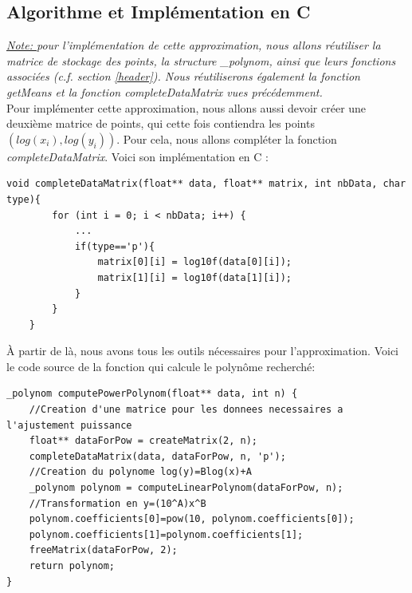 \subsection{Algorithme et Implémentation en C}
\textit{\underline{Note: } pour l'implémentation de cette approximation, nous allons réutiliser la matrice de stockage des points, la structure \_polynom, ainsi que leurs fonctions associées (c.f. section \ref{header}). Nous réutiliserons également la fonction getMeans et la fonction completeDataMatrix vues précédemment.}\vspace{5pt}\\
Pour implémenter cette approximation, nous allons aussi devoir créer une deuxième matrice de points, qui cette fois contiendra les points $(log(x_i), log(y_i))$. Pour cela, nous allons compléter la fonction \textit{completeDataMatrix}. Voici son implémentation en C :\\
\begin{lstlisting}[mathescape=true, basicstyle=\fontsize{8}{10}\selectfont, frame=single]
    void completeDataMatrix(float** data, float** matrix, int nbData, char type){
        for (int i = 0; i < nbData; i++) {
            ...
            if(type=='p'){
                matrix[0][i] = log10f(data[0][i]);
                matrix[1][i] = log10f(data[1][i]);
            }
        }
    }       
\end{lstlisting}
À partir de là, nous avons tous les outils nécessaires pour l'approximation. Voici le code source de la fonction qui calcule le polynôme recherché:\\
\begin{lstlisting}[mathescape=true, basicstyle=\fontsize{8}{10}\selectfont, frame=single]
_polynom computePowerPolynom(float** data, int n) {
    //Creation d'une matrice pour les donnees necessaires a l'ajustement puissance
    float** dataForPow = createMatrix(2, n);
    completeDataMatrix(data, dataForPow, n, 'p');
    //Creation du polynome log(y)=Blog(x)+A
    _polynom polynom = computeLinearPolynom(dataForPow, n);
    //Transformation en y=(10^A)x^B
    polynom.coefficients[0]=pow(10, polynom.coefficients[0]);
    polynom.coefficients[1]=polynom.coefficients[1];
    freeMatrix(dataForPow, 2);
    return polynom;
}
\end{lstlisting}
\newpage
